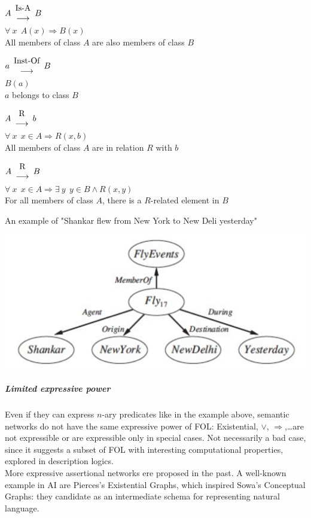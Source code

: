 \documentclass[10pt]{report}
\begin{document}
\begin{list}{}{}
	\item $A \begin{array}{c}
	\hbox{Is-A}\\\longrightarrow
	\end{array} B$\\
	$\forall\:x\:\:A(x)\Rightarrow B(x)$\\
	All members of class $A$ are also members of class $B$
	\item $a \begin{array}{c}
	\hbox{Inst-Of}\\\longrightarrow
	\end{array} B$\\
	$B(a)$\\
	$a$ belongs to class $B$
	\item $A \begin{array}{c}
	\hbox{R}\\\longrightarrow
	\end{array} b$\\
	$\forall\:x\:\:x\in A\Rightarrow R(x,b)$\\
	All members of class $A$ are in relation $R$ with $b$
	\item $A \begin{array}{c}
	\hbox{R}\\\longrightarrow
	\end{array} B$\\
	$\forall\:x\:\:x\in A\Rightarrow \exists\:y\:\:y\in B \wedge R(x,y)$\\
	For all members of class $A$, there is a $R$-related element in $B$
\end{list}
An example of "Shankar flew from New York to New Deli yesterday"
\begin{center}
	\includegraphics[scale=0.5]{18.png}
\end{center}
\subparagraph{Limited expressive power} Even if they can express $n$-ary predicates like in the example above, semantic networks do not have the same expressive power of FOL: Existential, $\vee$, $\Rightarrow$,\ldots are not expressible or are expressible only in special cases. Not necessarily a bad case, since it suggests a subset of FOL with interesting computational properties, explored in description logics.\\
More expressive assertional networks ere proposed in the past. A well-known example in AI are Pierces's Existential Graphs, which inspired Sowa's Conceptual Graphs: they candidate as an intermediate schema for representing natural language.
\end{document}
